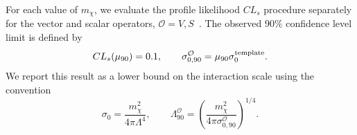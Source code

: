 \documentclass[aps,twocolumn,superscriptaddress,groupedaddress,nofootinbib,floatfix]{revtex4}
\begin{document}
For each value of $m_\chi$, we evaluate the profile likelihood $CL_s$
procedure separately for the vector and scalar operators,
$\mathcal O=V,S$~\cite{Read:2002hq,Cowan:2010js,Heinrich:2021zdu}.
The observed $90\%$ confidence level limit is defined by
\begin{equation}
CL_s(\mu_{90})=0.1,
\qquad
\sigma_{0,90}^{\mathcal O}
=
\mu_{90}\sigma_0^{\rm template}.
\label{eq:kamland-sigma-limit}
\end{equation}
We report this result as a lower bound on the interaction scale using
the convention
\begin{equation}
\sigma_0=
\frac{m_\chi^2}{4\pi\Lambda^4},
\qquad
\Lambda_{90}^{\mathcal O}
=
\left(
\frac{m_\chi^2}
{4\pi\sigma_{0,90}^{\mathcal O}}
\right)^{1/4}.
\label{eq:kamland-sigma-lambda}
\end{equation}
\clearpage
\twocolumngrid



\end{document}
